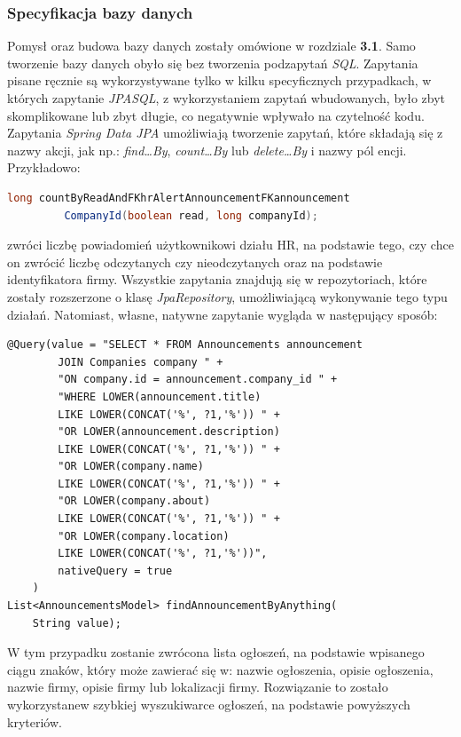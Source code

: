 \documentclass[twoside]{projektInzynierskiMS}
\numberwithin{figure}{section}
\begin{document}
\subsubsection{Specyfikacja bazy danych}
Pomysł oraz budowa bazy danych zostały omówione w rozdziale \textbf{3.1}. Samo tworzenie bazy danych obyło się bez tworzenia podzapytań \textit{SQL}. Zapytania pisane ręcznie są wykorzystywane tylko w kilku specyficznych przypadkach, w których zapytanie \textit{JPASQL}, z wykorzystaniem zapytań wbudowanych, było zbyt skomplikowane lub zbyt długie, co negatywnie wpływało na czytelność kodu. Zapytania \textit{Spring Data JPA} umożliwiają tworzenie zapytań, które składają się z nazwy akcji, jak np.: \textit{find…By}, \textit{count…By} lub \textit{delete…By} i nazwy pól encji. Przykładowo:
\begin{lstlisting}[language=Java,caption=Kod źródłowy wysyłający zapytanie do bazy o ilość nieodczytanych powiadomień dla działu HR danej firmy. Źródło: Opracowanie własne. ,captionpos=b]
    long countByReadAndFKhrAlertAnnouncementFKannouncement
         CompanyId(boolean read, long companyId);
\end{lstlisting}
zwróci liczbę powiadomień użytkownikowi działu HR, na podstawie tego, czy chce on zwrócić liczbę odczytanych czy nieodczytanych oraz na podstawie identyfikatora firmy.
Wszystkie zapytania znajdują się w repozytoriach, które zostały rozszerzone o klasę \textit{JpaRepository}, umożliwiającą wykonywanie tego typu działań.
Natomiast, własne, natywne zapytanie wygląda w następujący sposób:

\newpage

\begin{lstlisting}[caption=Natywne zapytanie do bazy danych w celu pobrania konkretnych informacji. Źródło: Opracowanie własne. ,captionpos=b]
    @Query(value = "SELECT * FROM Announcements announcement 
        JOIN Companies company " +
        "ON company.id = announcement.company_id " +
        "WHERE LOWER(announcement.title) 
        LIKE LOWER(CONCAT('%', ?1,'%')) " +
        "OR LOWER(announcement.description) 
        LIKE LOWER(CONCAT('%', ?1,'%')) " +
        "OR LOWER(company.name) 
        LIKE LOWER(CONCAT('%', ?1,'%')) " +
        "OR LOWER(company.about) 
        LIKE LOWER(CONCAT('%', ?1,'%')) " +
        "OR LOWER(company.location) 
        LIKE LOWER(CONCAT('%', ?1,'%'))", 
        nativeQuery = true
    )
List<AnnouncementsModel> findAnnouncementByAnything(
    String value);
\end{lstlisting}
W tym przypadku zostanie zwrócona lista ogłoszeń, na podstawie wpisanego ciągu znaków, który może zawierać się w: nazwie ogłoszenia, opisie ogłoszenia, nazwie firmy, opisie firmy lub lokalizacji firmy. Rozwiązanie to zostało wykorzystane\linebreak w szybkiej wyszukiwarce ogłoszeń, na podstawie powyższych kryteriów.
\end{document}
